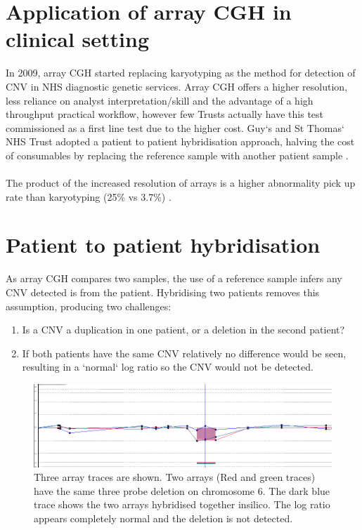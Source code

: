 \section{Application of array CGH in clinical setting}
In 2009, array CGH started replacing karyotyping as the method for detection of CNV in NHS diagnostic genetic services. Array CGH offers a higher resolution, less reliance on analyst interpretation/skill and the advantage of a high throughput practical workflow, however few Trusts actually have this test commissioned as a first line test due to the higher cost. Guy`s and St Thomas` NHS Trust adopted a patient to patient hybridisation approach, halving the cost of consumables by replacing the reference sample with another patient sample \cite{ahn2010}.

\paragraph*{}
The product of the increased resolution of arrays is a higher abnormality pick up rate than karyotyping (25\% vs 3.7\%) \cite{ahn2013,jordan_microarrays_2012}. 

\section{Patient to patient hybridisation}
As array CGH compares two samples, the use of a reference sample infers any CNV detected is from the patient. Hybridising two patients removes this assumption, producing two challenges:
\begin{enumerate}
\item Is a CNV a duplication in one patient, or a deletion in the second patient?
\item If both patients have the same CNV relatively no difference would be seen, resulting in a `normal` log ratio so the CNV would not be detected.
\end{enumerate}
\begin{figure}
\centering
\includegraphics[width=\linewidth]{./Figures/SharedImbalance.jpg}
\caption{Three array traces are shown. Two arrays (Red and green traces) have the same three probe deletion on chromosome 6. The dark blue trace shows the two arrays hybridised together insilico. The log ratio appears completely normal and the deletion is not detected.}
\label{fig:SharedImbalance}
\end{figure}

